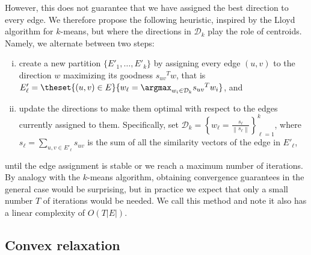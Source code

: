 However,
this does not guarantee that we have assigned the best direction to every edge. We therefore propose
the following heuristic, inspired by the Lloyd algorithm for $k$-means, but where the directions in
$\mathcal{D}_k$ play the role of centroids. Namely, we alternate between two steps:
\begin{enumerate}[(i), nosep]
  \item create a new partition $\{E'_1, \ldots, E'_k\}$ by assigning every edge $(u,v)$ to the
    direction $w$ maximizing its goodness ${s_{uv}}^T w$, that is $E'_\ell = \theset{(u,v) \in E}{
    w_\ell = \argmax_{w_i \in \mathcal{D}_k} {s_{uv}}^T w_i}$, and
  \item update the directions to make them optimal with respect to the edges currently assigned to
    them. Specifically, set $\mathcal{D}_k = \left\{ w_\ell = \frac{s_\ell}{\left\| s_\ell
    \right\|}\right\}_{\ell=1}^k $, where $s_\ell = \sum_{u,v \in E'_\ell} s_{uv}$ is the sum of all
    the similarity vectors of the edge in $E'_\ell$,
\end{enumerate}
until the edge assignment is stable or we reach a maximum number of iterations. By analogy with the
$k$-means algorithm, obtaining convergence guarantees in the general case would be surprising, but in
practice we expect that only a small number $T$ of iterations would be needed. We call this method
\lloyd{} and note it also has a linear complexity of $O(T|E|)$.

\subsection{Convex relaxation}
\label{sub:edge_vector}

